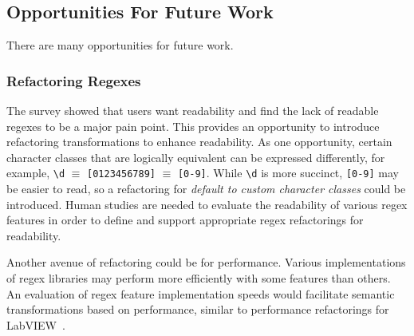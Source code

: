 \subsection{Opportunities For Future Work}

There are many opportunities for future work. %




\subsubsection{Refactoring Regexes}
The survey showed that users want readability and find the lack of readable regexes to be a major pain point.
This provides an opportunity to introduce refactoring transformations to enhance readability.
As one opportunity, certain character classes that are logically equivalent can be expressed differently, for example, \verb!\d! $\equiv$ \verb![0123456789]! $\equiv$ \verb![0-9]!. While \verb!\d! is more succinct, \verb![0-9]! may be easier to read, so a refactoring for \emph{default to custom character classes} could be introduced.
Human studies are needed to evaluate the readability of various regex features in order to define and support appropriate regex refactorings for readability.

Another avenue of refactoring could be for performance. Various implementations of regex libraries may perform more efficiently with some features than others. An evaluation of regex feature implementation speeds would facilitate semantic transformations based on performance, similar to performance refactorings for LabVIEW~\cite{chambers2013smell, chambers2015impact}.


